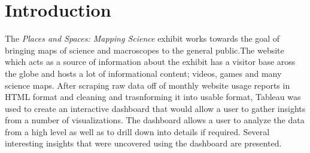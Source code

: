 \section{Introduction} \label{intro}

The \textit{Places and Spaces: Mapping Science} exhibit works towards the goal of bringing maps of science and macroscopes to the general public.The website which acts as a source of information about the exhibit has a visitor base aross the globe and hosts a lot of informational content; videos, games and many science maps. After scraping raw data off of monthly website usage reports in HTML format and cleaning and trasnforming it into usable format, Tableau was used to create an interactive dashboard that would allow a user to gather insights from a number of visualizations. The dashboard allows a user to analyze the data from a high level as well as to drill down into details if required. Several interesting insights that were uncovered using the dashboard are presented.



